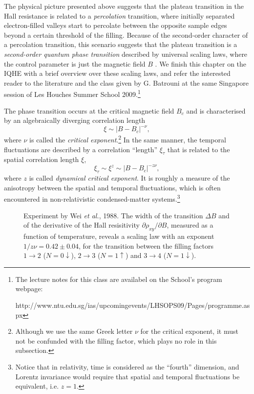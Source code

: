 \documentclass[10pt]{book}
\newcommand{\beq}{\begin{equation}}
\newcommand{\eeq}{\end{equation}}
\begin{document}
The physical picture presented above suggests that the plateau transition in the Hall resistance is related to a {\sl percolation}
transition, where initially separated electron-filled valleys start to percolate between the opposite sample edges beyond 
a certain threshold of the filling. Because of the second-order character of a percolation transition, this scenario
suggests that the plateau transition is a {\sl second-order quantum phase transition} described by universal scaling laws,
where the control parameter is just the magnetic field $B$ \cite{sondhiRev,sachdev}. We finish this chapter on the IQHE with 
a brief overview over these scaling laws, and refer the interested reader to the literature \cite{sondhiRev,sachdev} and the 
class given by G. Batrouni at the same Singapore session of Les Houches Summer School 2009.\footnote{The  
lecture notes for this class are availabel on the School's program webpage: 

\noindent
http://www.ntu.edu.sg/ias/upcomingevents/LHSOPS09/Pages/programme.aspx
}

The phase transition occurs at the critical magnetic field $B_c$ and is characterised by an algebraically diverging correlation
length 
\beq\label{corrL}
\xi \sim \left|B - B_c\right|^{-\nu},
\eeq
where $\nu$ is called the {\sl critical exponent}.\footnote{Although we use the same Greek letter $\nu$ for the critical exponent,
it must not be confunded with the filling factor, which plays no role in this subsection.}
In the same manner, the temporal fluctuations are described by a correlation ``length'' $\xi_{\tau}$ that is related to the 
spatial correlation length $\xi$,
\beq\label{corrLtau}
\xi_{\tau} \sim \xi^z \sim \left|B - B_c\right|^{-z\nu},
\eeq
where $z$ is called {\sl dynamical critical exponent}. It is roughly a measure of the anisotropy between the spatial and
temporal fluctuations, which is often encountered in non-relativistic condensed-matter systems.\footnote{Notice that in
relativity, time is considered as the ``fourth'' dimension, and Lorentz invariance would require that spatial and temporal
fluctuations be equivalent, i.e. $z=1$.}

\begin{figure}
\begin{center}
\end{center}
\caption{ Experiment by Wei {\sl et al.}, 1988. The width of the transition $\Delta B$ and of the derivative of the 
Hall resisitivity $\partial \rho_{xy}/\partial B$, measured as a function of temperature, reveals a scaling law 
with an exponent $1/z\nu=0.42\pm 0.04$, for the transition between the filling factors $1\to 2$ ($N=0\downarrow$),
 $2\to 3$ ($N=1\uparrow$) and $3\to 4$ ($N=1\downarrow$). }
\label{fig16}
\end{figure}
\end{document}
